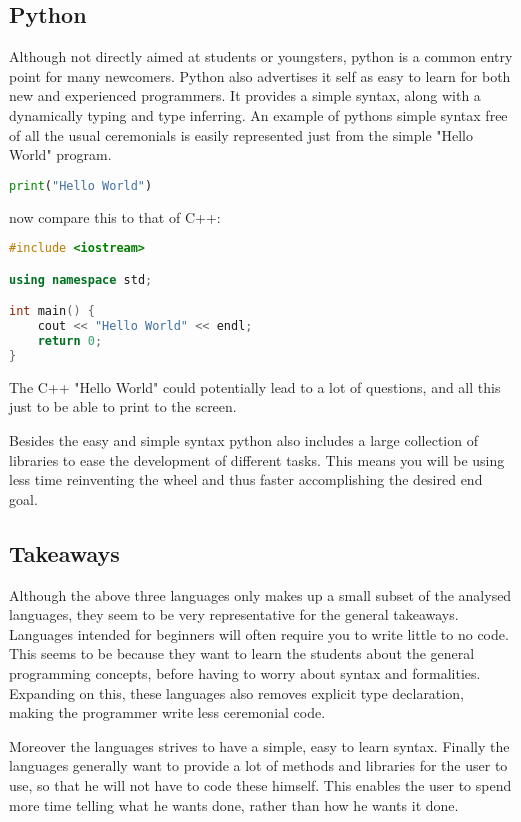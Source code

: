 \subsection{Python}
Although not directly aimed at students or youngsters, python is a common entry point for many newcomers. 
Python also advertises it self as easy to learn for both new and experienced programmers. 
It provides a simple syntax, along with a dynamically typing and type inferring.\cite{PythonWebsite}
An example of pythons simple syntax free of all the usual ceremonials is easily represented just from the simple "Hello World" program.

\begin{lstlisting}[language=Python,label=lis:PythonHelloWorld,caption=Hello World in python]
print("Hello World")
\end{lstlisting}

now compare this to that of C++:

\begin{lstlisting}[language=C++,label=lis:C++HelloWorld,caption=Hello World in C++]
#include <iostream>

using namespace std;

int main() {
	cout << "Hello World" << endl;
	return 0;
}
\end{lstlisting}

The C++ "Hello World" could potentially lead to a lot of questions, and all this just to be able to print to the screen.

Besides the easy and simple syntax python also includes a large collection of libraries to ease the development of different tasks.\cite{PythonLibraries}
This means you will be using less time reinventing the wheel and thus faster accomplishing the desired end goal.\cite{PythonXKCD}

\subsection{Takeaways}
Although the above three languages only makes up a small subset of the analysed languages, they seem to be very representative for the general takeaways. 
Languages intended for beginners will often require you to write little to no code. 
This seems to be because they want to learn the students about the general programming concepts, before having to worry about syntax and formalities. 
Expanding on this, these languages also removes explicit type declaration, making the programmer write less ceremonial code.

Moreover the languages strives to have a simple, easy to learn syntax. 
Finally the languages generally want to provide a lot of methods and libraries for the user to use, so that he will not have to code these himself. 
This enables the user to spend more time telling what he wants done, rather than how he wants it done.
